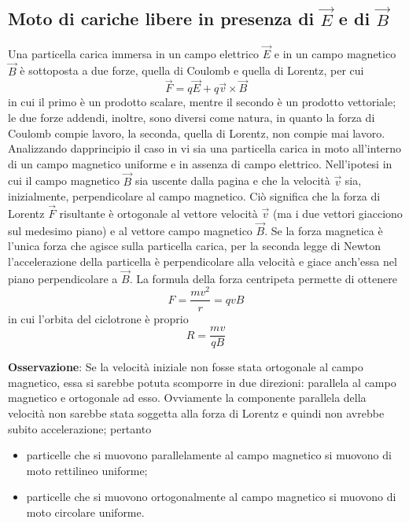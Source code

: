 \documentclass[a4paper]{extarticle}
\begin{document}
\subsection{Moto di cariche libere in presenza di $\vec E$ e di $\vec B$}
Una particella carica immersa in un campo elettrico $\vec E$ e in un campo magnetico $\vec B$ è sottoposta a due forze, quella di Coulomb e quella di Lorentz, per cui
\[\vec F = q \vec E + q \vec v \times \vec B\]
in cui il primo è un prodotto scalare, mentre il secondo è un prodotto vettoriale; le due forze addendi, inoltre, sono diversi come natura, in quanto la forza di Coulomb compie lavoro, la seconda, quella di Lorentz, non compie mai lavoro.\\
Analizzando dapprincipio il caso in vi sia una particella carica in moto all'interno di un campo magnetico uniforme e in assenza di campo elettrico. Nell'ipotesi in cui il campo magnetico $\vec B$ sia uscente dalla pagina e che la velocità $\vec v$ sia, inizialmente, perpendicolare al campo magnetico. Ciò significa che la forza di Lorentz $\vec F$ risultante è ortogonale al vettore velocità $\vec v$ (ma i due vettori giacciono sul medesimo piano) e al vettore campo magnetico $\vec B$. Se la forza magnetica è l'unica forza che agisce sulla particella carica, per la seconda legge di Newton l'accelerazione della particella è perpendicolare alla velocità e giace anch'essa nel piano perpendicolare a $\vec B$. La formula della forza centripeta permette di ottenere
\[F = \dfrac{mv^2}{r} = qvB\]
in cui l'orbita del ciclotrone è proprio
\[R = \dfrac{mv}{qB}\]

\vspace{1em}
\noindent
\textbf{Osservazione}: Se la velocità iniziale non fosse stata ortogonale al campo magnetico, essa si sarebbe potuta scomporre in due direzioni: parallela al campo magnetico e ortogonale ad esso. Ovviamente la componente parallela della velocità non sarebbe stata soggetta alla forza di Lorentz e quindi non avrebbe subito accelerazione; pertanto
\begin{itemize}
  \item particelle che si muovono parallelamente al campo magnetico si muovono di moto rettilineo uniforme;
  \item particelle che si muovono ortogonalmente al campo magnetico si muovono di moto circolare uniforme.
\end{itemize}

\vspace{1em}
\noindent
\end{document}
